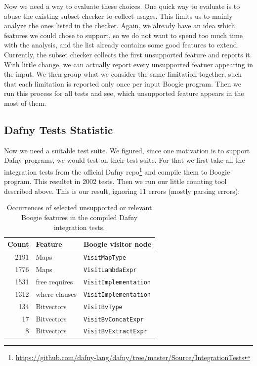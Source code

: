 Now we need a way to evaluate these choices.
One quick way to evaluate is to abuse the existing subset checker to collect usages.
This limits us to mainly analyze the ones listed in the checker.
Again, we already have an idea which features we could chose to support,
so we do not want to spend too much time with the analysis,
and the list already contains some good features to extend.
Currently, the subset checker collects the first unsupported feature and reports it.
With little change, we can actually report every unsupported featuer appearing in the input.
We then group what we consider the same limitation together, such that each limitation is reported only once per input Boogie program.
Then we run this process for all tests and see, which unsupported feature appears in the most of them.


\subsection{Dafny Tests Statistic}

Now we need a suitable test suite.
We figured, since one motivation is to support Dafny programs, we would test on their test suite.
For that we first take all the integration tests from the official Dafny repo\footnote{\url{https://github.com/dafny-lang/dafny/tree/master/Source/IntegrationTests}} and compile them to Boogie program.
This resultet in 2002 tests.
Then we run our little counting tool described above.
This is our result, ignoring 11 errors (mostly parsing errors):
\begin{table}[t]
  \centering
  \begin{tabular}{r l l}
    \hline
    Count & Feature & Boogie visitor node \\
    \hline
    2191 & Maps & \texttt{VisitMapType} \\
    1776 & Maps & \texttt{VisitLambdaExpr} \\
    1531 & free requires & \texttt{VisitImplementation} \\
    1312 & where clauses & \texttt{VisitImplementation} \\
     134 & Bitvectors & \texttt{VisitBvType} \\
      17 & Bitvectors & \texttt{VisitBvConcatExpr} \\
       8 & Bitvectors & \texttt{VisitBvExtractExpr} \\
    \hline
  \end{tabular}
  \caption{Occurrences of selected unsupported or relevant Boogie features in the compiled Dafny integration tests.}
  \label{tab:dafny-feature-counts}
\end{table}

